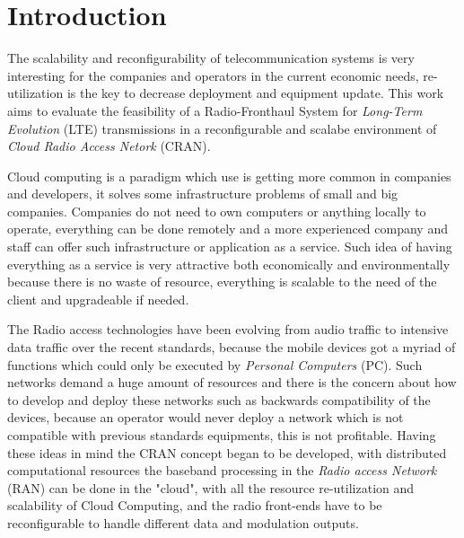 \chapter{Introduction}
\label{chap:intro}


The scalability and reconfigurability of telecommunication systems is very
interesting for the companies and operators in the current economic needs,
re-utilization is the key to decrease deployment and equipment update. This work
aims to evaluate the feasibility of a Radio-Fronthaul System for
\textit{Long-Term Evolution} (LTE) transmissions in a reconfigurable and scalabe
environment of \textit{Cloud Radio Access Netork} (CRAN).

Cloud computing is a paradigm which use is getting more common in companies and
developers, it solves some infrastructure problems of small and big companies.
Companies do not need to own computers or anything locally to operate,
everything can be done remotely and a more experienced company and staff can
offer such infrastructure or application as a service. Such idea of having
everything as a service is very attractive both economically  and
environmentally because there is no waste of resource, everything is scalable to
the need of the client and upgradeable if needed.

The Radio access technologies have been evolving from audio traffic to intensive
data traffic over the recent standards, because the mobile devices got a myriad
of functions which could only be executed by \textit{Personal Computers} (PC).
Such networks demand a huge amount of resources and there is the concern about
how to develop and deploy these networks such as backwards compatibility of the
devices, because an operator would never deploy a network which is not
compatible with previous standards equipments, this is not profitable. Having
these ideas in mind the CRAN concept began to be developed, with distributed
computational resources the baseband processing in the \textit{Radio access
Network} (RAN) can be done in the "cloud", with all the resource re-utilization
and scalability of Cloud Computing,  and the radio front-ends have to be
reconfigurable to handle different data and modulation outputs.

